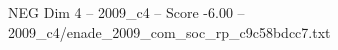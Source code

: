 \begin{textsample}{NEG Dim 4 – 2009\_c4 – Score -6.00 – 2009\_c4/enade\_2009\_com\_soc\_rp\_c9c58bdcc7.txt}
\end{textsample}
